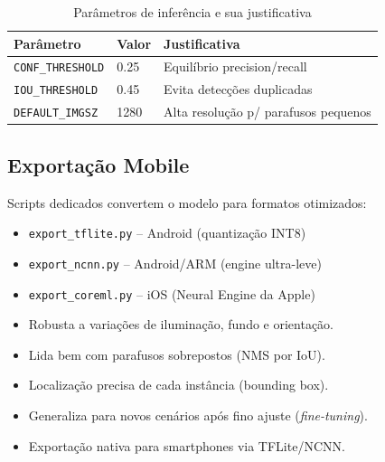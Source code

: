\documentclass[12pt,a4paper]{article}
\begin{document}
\begin{table}[H]
  \centering
  \caption{Par\^ametros de infer\^encia e sua justificativa}
  \label{tab:hiper}
  \begin{tabular}{lll}
    \toprule
    \textbf{Par\^ametro} & \textbf{Valor} & \textbf{Justificativa} \\
    \midrule
    \texttt{CONF\_THRESHOLD} & 0.25 & Equil\'ibrio precision/recall \\
    \texttt{IOU\_THRESHOLD}  & 0.45 & Evita detec\c{c}\~oes duplicadas \\
    \texttt{DEFAULT\_IMGSZ}  & 1280 & Alta resolu\c{c}\~ao p/ parafusos pequenos \\
    \bottomrule
  \end{tabular}
\end{table}

\subsection{Exporta\c{c}\~ao Mobile}

Scripts dedicados convertem o modelo para formatos otimizados:

\begin{itemize}[leftmargin=*]
  \item \texttt{export\_tflite.py} -- Android (quantiza\c{c}\~ao INT8)
  \item \texttt{export\_ncnn.py}  -- Android/ARM (engine ultra-leve)
  \item \texttt{export\_coreml.py} -- iOS (Neural Engine da Apple)
\end{itemize}

\begin{tcolorbox}[vantagem={Vantagens da Solu\c{c}\~ao 2}]
\begin{itemize}[leftmargin=*, noitemsep]
  \item Robusta a varia\c{c}\~oes de ilumina\c{c}\~ao, fundo e orienta\c{c}\~ao.
  \item Lida bem com parafusos sobrepostos (NMS por IoU).
  \item Localiza\c{c}\~ao precisa de cada inst\^ancia (bounding box).
  \item Generaliza para novos cen\'arios ap\'os fino ajuste (\emph{fine-tuning}).
  \item Exporta\c{c}\~ao nativa para smartphones via TFLite/NCNN.
\end{itemize}
\end{tcolorbox}

\end{document}
